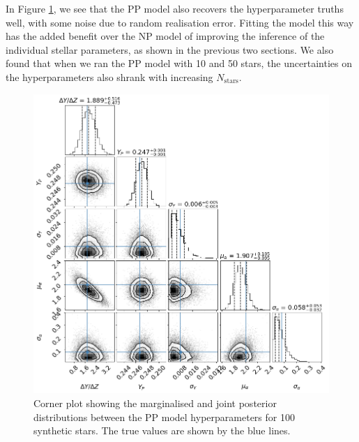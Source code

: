 \documentclass[a4paper,fleqn,usenatbib]{mnras}
\begin{document}

In Figure \ref{fig:test-corners-pp}, we see that the PP model also recovers the hyperparameter truths well, with some noise due to random realisation error. Fitting the model this way has the added benefit over the NP model of improving the inference of the individual stellar parameters, as shown in the previous two sections. We also found that when we ran the PP model with 10 and 50 stars, the uncertainties on the hyperparameters also shrank with increasing $N_\mathrm{stars}$.

\begin{figure}
    \centering
    \includegraphics[width=\linewidth]{figures/corner_plot_pp_truths.png}
    \caption{Corner plot showing the marginalised and joint posterior distributions between the PP model hyperparameters for 100 synthetic stars. The true values are shown by the blue lines.}  
    \label{fig:test-corners-pp}   
\end{figure}
\end{document}
